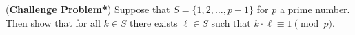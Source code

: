 (\textbf{Challenge Problem*}) Suppose that $S = \{1, 2, \dots, p-1\}$ for $p$ a prime number. Then show that for all $k \in S$ there exists $\ell \in S$ such that $k \cdot \ell \equiv 1 \pmod{p}$.